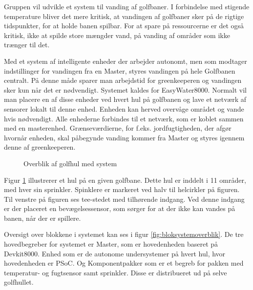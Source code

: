 Gruppen vil udvikle et system til vanding af golfbaner. I forbindelse med stigende temperature bliver det mere kritisk, at vandingen af golfbaner sker på de rigtige tidspunkter, for at holde banen spilbar. For at spare på ressourcerne er det også kritisk, ikke at spilde store mængder vand, på vanding af områder som ikke trænger til det. 

Med et system af intelligente enheder der arbejder autonomt, men som modtager indstillinger for vandingen fra en Master, styres vandingen på hele Golfbanen centralt. På denne måde sparer man arbejdstid for greenkeeperen og vandingen sker kun når det er nødvendigt. Systemet kaldes for EasyWater8000. 
Normalt vil man placere en af disse enheder ved hvert hul på golfbanen og lave et netværk af sensorer lokalt til denne enhed. Enheden kan herved overvåge området og vande hvis nødvendigt. Alle enhederne forbindes til et netværk, som er koblet sammen med en masterenhed. Grænseværdierne, for f.eks. jordfugtigheden, der afgør hvornår enheden, skal påbegynde vanding kommer fra Master og styres igennem denne af greenkeeperen. 


\begin{figure}[ht] \centering
{}
\caption{Overblik af golfhul med system}
\label{fig:systemoverblik}
\end{figure}

Figur \ref{fig:systemoverblik} illustrerer et hul på en given golfbane. Dette hul er inddelt i 11 områder, med hver sin sprinkler. Spinklere er markeret ved halv til helcirkler på figuren. Til venstre på figuren ses tee-stedet med tilhørende indgang. Ved denne indgang er der placeret en bevægelsessensor, som sørger for at der ikke kan vandes på banen, når der er spillere. 

Oversigt over blokkene i systemet kan ses i figur \ref{fig:bloksystemoverblik}. De tre hovedbegreber for systemet er Master, som er hovedenheden baseret på Devkit8000. Enhed som er de autonome undersystemer på hvert hul, hvor hovedenheden er PSoC. Og Komponentpakker som er et begreb for pakken med temperatur- og fugtsensor samt sprinkler. Disse er distribueret ud på selve golfhullet.

